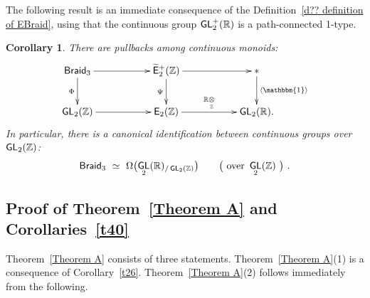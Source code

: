 \documentclass{amsart}
\newtheorem{cor}[theorem]{Corollary}
\theoremstyle{definition}
\theoremstyle{remark}
\def\ot{\otimes}
\newcommand{\lag}{\langle}
\newcommand{\rag}{\rangle}
\newcommand{\w}{\widetilde}
\def\sE{\mathsf E}\def\sF{\mathsf F}\def\sG{\mathsf G}\def\sH{\mathsf H}
\DeclareMathOperator{\uno}{\mathbbm{1}}
\DeclareMathOperator{\Braid}{{\sf Braid}_3}
\DeclareMathOperator{\Ebraid}{\w{\sf E}_{2}^{+}(\ZZ)}
\DeclareMathOperator{\GL}{\sf GL}
\DeclareMathOperator{\SL}{\sf SL}
\DeclareMathOperator{\EZ}{\sE_2(\ZZ)}
\begin{document}
The following result is an immediate consequence of the Definition~\ref{d?? definition of EBraid}, using that the continuous group $\GL^+_2(\RR)$ is a path-connected 1-type.
\begin{cor}
\label{t31}
There are pullbacks among continuous monoids:
\begin{equation*}%
\xymatrix{
\Braid
\ar[rr]
\ar[d]_-{\Phi}
&&
\Ebraid
\ar[d]_-{\Psi} \ar[rr]
&&
\ast \ar[d]^-{\lag \uno \rag}
\\
\GL_2(\ZZ)
\ar[rr]
&&
\EZ
\ar[rr]^-{\RR \underset{\ZZ}\ot}
&&
\GL_2(\RR)
.
}
\end{equation*}
In particular, there is a canonical identification between continuous groups over $\GL_2(\ZZ)$:
\[
\Braid
~\simeq~
\Omega\bigl(
\GL_2(\RR)_{/\GL_2(\ZZ)}
\bigr)
\qquad
\bigl({\rm ~over~}
\GL_2(\ZZ)
~\bigr)
~.
\]

\end{cor}









































\subsection{Proof of Theorem~\ref{Theorem A} and Corollaries~\ref{t40} }
Theorem~\ref{Theorem A} consists of three statements. 
Theorem~\ref{Theorem A}(1) is a consequence of Corollary~\ref{t26}.
Theorem~\ref{Theorem A}(2) follows immediately from the following.
\end{document}
